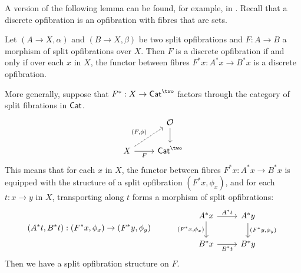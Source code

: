 A version of the following lemma can be found, for example,
in \cite[Theorem 4.1]{streicher2018}.
Recall that a discrete opfibration is an opfibration
with fibres that are sets.
\begin{lemma}\label{lem:split-opfib-between-split-opfibs}
  Let $(A \to X, \alpha)$ and $(B \to X, \beta)$ be two
  split opfibrations and $F : A \to B$
  a morphism of split opfibrations over $X$.
  Then $F$ is a discrete opfibration
  if and only if 
  over each $x$ in $X$,
  the functor between fibres $F^* x : A^* x \to B^* x$
  is a discrete opfibration.

  More generally,
  suppose that $F^* : X \to \Cat^\two$ factors through the
  category of split fibrations in $\mathsf{Cat}$.
  \[
    \begin{tikzcd}
      & \opfibcart \\
      X & {\Cat^\two}
      \arrow[from=1-2, to=2-2]
      \arrow["{(F,\phi)}", dashed, from=2-1, to=1-2]
      \arrow["F"', from=2-1, to=2-2]
    \end{tikzcd}
  \]
  This means that for each $x$ in $X$,
  the functor between fibres $F^* x : A^* x \to B^* x$
  is equipped with the structure of a split opfibration
  $(F^* x, \phi_x)$,
  and for each $t : x \to y$ in $X$,
  transporting along $t$ forms
  a morphism of split opfibrations:
  \[(A^* t, B^* t) : (F^* x,\phi_x) \to (F^* y,\phi_y)
    \quad \quad \quad
    \begin{tikzcd}
      {A^* x} & {A^* y} \\
      {B^* x} & {B^* y}
      \arrow["{A^* t}", from=1-1, to=1-2]
      \arrow["{(F^* x,\phi_x)}"', from=1-1, to=2-1]
      \arrow["{(F^* y,\phi_y)}", from=1-2, to=2-2]
      \arrow["{B^* t}"', from=2-1, to=2-2]
    \end{tikzcd} \]
  Then we have a split opfibration structure on $F$.
\end{lemma}
